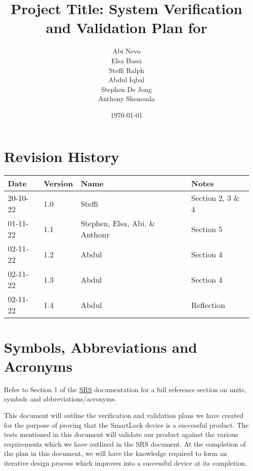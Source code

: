 \documentclass[12pt, titlepage]{article}
\begin{document}
\title{Project Title: System Verification and Validation Plan for } 
\author{Abi Nevo\\Elsa Bassi\\Steffi Ralph\\Abdul Iqbal\\Stephen De Jong\\Anthony Shenouda}
\date{\today}
	
\maketitle


\section{Revision History}

\begin{tabularx}{\textwidth}{p{2cm}p{2cm}p{2cm}X}
\toprule {\bf Date} & {\bf Version} & {\bf Name} & {\bf Notes}\\
\midrule
20-10-22 & 1.0 & Steffi & Section 2, 3 \& 4\\
01-11-22 & 1.1 & Stephen, Elsa, Abi, \& Anthony & Section 5\\
02-11-22 & 1.2 & Abdul & Section 4\\
02-11-22 & 1.3 & Abdul & Section 4\\
02-11-22 & 1.4 & Abdul & Reflection\\
\bottomrule
\end{tabularx}

\newpage

\tableofcontents

\listoftables


\newpage

\section{Symbols, Abbreviations and Acronyms}

Refer to Section 1 of the \href{https://github.com/NevoAbigail/Capstone/blob/main/docs/SRS/SRS.pdf}{SRS} documentation for a full reference section on units, symbols and abbreviations/acronyms.

\newpage


This document will outline the verification and validation plans we have created for the purpose of proving that the SmartLock device is a successful product. The tests mentioned in this document will validate our product against the various requirements which we have outlined in the SRS document. At the completion of the plan in this document, we will have the knowledge required to form an iterative design process which improves into a successful device at its completion. 
\end{document}
